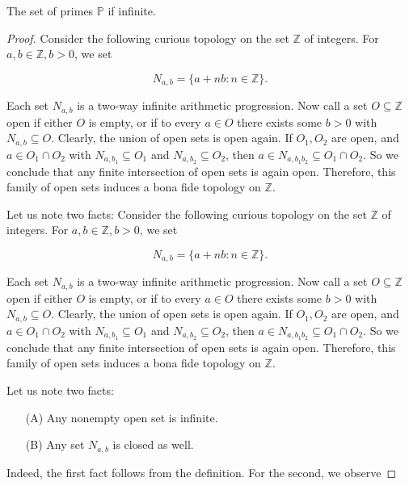 \begin{theorem}
    \label{thm:fifth_proof}
    \leanok
    The set of primes \(\mathbb{P}\) if infinite.
\end{theorem}
\begin{proof}
   Consider the following curious topology on the set \(\mathbb{Z}\) of integers. For \(a, b \in \mathbb{Z}, b > 0\), we set

    \[
    N_{a,b} = \{a + nb : n \in \mathbb{Z}\}.
    \]

    Each set \(N_{a,b}\) is a two-way infinite arithmetic progression.
    Now call a set \(O \subseteq \mathbb{Z}\) open if either \(O\) is empty, or if to every \(a \in O\) there exists some \(b > 0\) with \(N_{a,b} \subseteq O\).
    Clearly, the union of open sets is open again. If \(O_1, O_2\) are open,
    and \(a \in O_1 \cap O_2\) with \(N_{a,b_1} \subseteq O_1\) and \(N_{a,b_2} \subseteq O_2\), then \(a \in N_{a, b_1 b_2} \subseteq O_1 \cap O_2\). So we conclude that any finite intersection of open sets is again open. Therefore, this family of open sets induces a bona fide topology on \(\mathbb{Z}\).

    Let us note two facts:
    Consider the following curious topology on the set \(\mathbb{Z}\) of integers. For \(a, b \in \mathbb{Z}, b > 0\), we set

    \[
    N_{a,b} = \{a + nb : n \in \mathbb{Z}\}.
    \]

    Each set \(N_{a,b}\) is a two-way infinite arithmetic progression.
    Now call a set \(O \subseteq \mathbb{Z}\) open if either \(O\) is empty, or if to every \(a \in O\) there exists some \(b > 0\) with \(N_{a,b} \subseteq O\).
    Clearly, the union of open sets is open again. If \(O_1, O_2\) are open, and \(a \in O_1 \cap O_2\) with \(N_{a,b_1} \subseteq O_1\) and \(N_{a,b_2} \subseteq O_2\),
    then \(a \in N_{a, b_1 b_2} \subseteq O_1 \cap O_2\). So we conclude that any finite intersection of open sets is again open.
    Therefore, this family of open sets induces a bona fide topology on \(\mathbb{Z}\).

    Let us note two facts:

    \begin{itemize}
        \item[(A)] Any nonempty open set is infinite.
        \item[(B)] Any set \(N_{a,b}\) is closed as well.
    \end{itemize}

    Indeed, the first fact follows from the definition. For the second, we observe


\end{proof}

